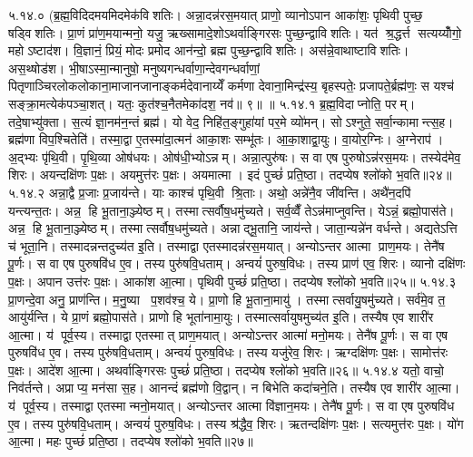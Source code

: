 ५.१४.०
(ब्र॒ह्म॒विदिदमयमिदमेक॑विशतिः। अन्ना॒दन्न॑रस॒मयात् प्राणो॒ व्यानोऽपान आका॑शः॒ पृथिवी पुच्छ॒ षड्विशतिः। प्रा॒णं प्रा॑ण॒मयान्मनो॒ यजु॒\ar{} ऋख्सामादे॒शोऽथर्वाङ्गिरसः पुच्छ॒न्द्वाविशतिः। यत॑ श्र॒द्धर्त्त सत्यय्योँ॑गो॒ महोऽष्टाद॑श। वि॒ज्ञानं॒ प्रियं॒ मोदः प्रमोद आन॑न्दो॒ ब्रह्म पुच्छ॒न्द्वाविशतिः। अस॑न्ने॒वाथाष्टाविशतिः। अस॒थ्षोड॑श। भी॒षाऽस्मा॒न्मानुषो॒ मनुष्यगन्धर्वाणा॒न्देवगन्धर्वाणां॒ पितृणाञ्चिरलोकलोकाना॒माजानजानाङ्कर्मदेवानाय्येँ कर्मणा देवाना॒मिन्द्र॑स्य॒ बृहस्पतेः॒ प्रजापते॒र्ब्रह्म॑णः॒ स यश्च॑ सङ्क्रा॒मत्येक॑पञ्चा॒शत्। यतः॒ कुत॑श्च॒नैतमेका॑दश॒ नव॑॥ ९॥ ॥
५.१४.१
ब्र॒ह्म॒विदाप्नोति॒ परम्। तदे॒षाभ्यु॑क्ता। स॒त्यं ज्ञा॒नम॑न॒न्तं ब्रह्म॑। यो वेद॒ निहि॑त॒ङ्गुहा॑यां पर॒मे व्यो॑मन्। सोऽश्नुते॒ सर्वा॒न्कामान्त्स॒ह। ब्रह्म॑णा विप॒श्चितेति॑। तस्मा॒द्वा ए॒तस्मा॑दा॒त्मन॑ आका॒शः सम्भू॑तः। आ॒का॒शाद्वा॒युः। वा॒योर॒ग्निः। अ॒ग्नेराप॑। अ॒द्भ्यः पृ॑थि॒वी। पृ॒थि॒व्या ओष॑धयः। ओष॑धी॒भ्योऽन्नम्। अन्ना॒त्पुरु॑षः। स वा एष पुरुषोऽन्न॑रस॒मयः। तस्येद॑मेव॒ शिरः। अयन्दक्षि॑णः प॒क्षः। अयमुत्त॑रः प॒क्षः। अयमात्मा। इदं पुच्छं॑ प्रति॒ष्ठा। तदप्येष श्लो॑को भ॒वति॥२४॥
५.१४.२
अन्ना॒द्वै प्र॒जाः प्र॒जाय॑न्ते। याः काश्च॑ पृथि॒वी श्रि॒ताः। अथो॒ अन्ने॑नै॒व जी॑वन्ति। अथै॑न॒दपि॑ यन्त्यन्त॒तः। अन्न॒ हि भू॒ताना॒ञ्ज्येष्ठम्। तस्मात्सर्वौष॒धमु॑च्यते। सर्व॒व्वैँ तेऽन्न॑माप्नुवन्ति। येऽन्नं॒ ब्रह्मो॒पास॑ते। अन्न॒ हि भू॒ताना॒ञ्ज्येष्ठम्। तस्मात्सर्वौष॒धमु॑च्यते। अन्नाद्भू॒तानि॒ जाय॑न्ते। जाता॒न्यन्ने॑न वर्धन्ते। अद्यतेऽत्ति च॑ भूता॒नि। तस्मादन्नन्तदुच्य॑त इ॒ति। तस्माद्वा एतस्मादन्न॑रस॒मयात्। अन्योऽन्तर आत्मा प्राण॒मयः। तेनै॑ष पू॒र्णः। स वा एष पुरुषवि॑ध ए॒व। तस्य पुरु॑षवि॒धताम्। अन्वयं॑ पुरुष॒विधः। तस्य प्राण॑ एव॒ शिरः। व्यानो दक्षि॑णः प॒क्षः। अपान उत्त॑रः प॒क्षः। आका॑श आ॒त्मा। पृथिवी पुच्छं॑ प्रति॒ष्ठा। तदप्येष श्लो॑को भ॒वति॥२५॥
५.१४.३
प्रा॒णन्दे॒वा अनु॒ प्राण॑न्ति। म॒नु॒ष्या प॒शव॑श्च॒ ये। प्रा॒णो हि भू॒ताना॒मायु॑। तस्मात्सर्वायु॒षमु॑च्यते। सर्व॑मे॒व त॒ आयु॑र्यन्ति। ये प्रा॒णं ब्रह्मो॒पास॑ते। प्राणो हि भूता॑नामा॒युः। तस्मात्सर्वायुषमुच्य॑त इ॒ति। तस्यैष एव शारी॑र आ॒त्मा। य॑ पूर्व॒स्य। तस्माद्वा एतस्मात् प्राण॒मयात्। अन्योऽन्तर आत्मा॑ मनो॒मयः। तेनै॑ष पू॒र्णः। स वा एष पुरुषवि॑ध ए॒व। तस्य पुरु॑षवि॒धताम्। अन्वयं॑ पुरुष॒विधः। तस्य यजु॑रेव॒ शिरः। ऋग्दक्षि॑णः प॒क्षः। सामोत्त॑रः प॒क्षः। आदे॑श आ॒त्मा। अथर्वाङ्गिरसः पुच्छं॑ प्रति॒ष्ठा। तदप्येष श्लो॑को भ॒वति॥२६॥
५.१४.४
यतो॒ वाचो॒ निव॑र्तन्ते। अप्राप्य॒ मन॑सा स॒ह। आनन्दं ब्रह्म॑णो वि॒द्वान्। न बिभेति कदा॑चने॒ति। तस्यैष एव शारी॑र आ॒त्मा। य॑ पूर्व॒स्य। तस्माद्वा एतस्मान्मनो॒मयात्। अन्योऽन्तर आत्मा वि॑ज्ञान॒मयः। तेनै॑ष पू॒र्णः। स वा एष पुरुषवि॑ध ए॒व। तस्य पुरु॑षवि॒धताम्। अन्वयं॑ पुरुष॒विधः। तस्य श्र॑द्धैव॒ शिरः। ऋतन्दक्षि॑णः प॒क्षः। सत्यमुत्त॑रः प॒क्षः। यो॑ग आ॒त्मा। महः पुच्छं॑ प्रति॒ष्ठा। तदप्येष श्लो॑को भ॒वति॥२७॥
